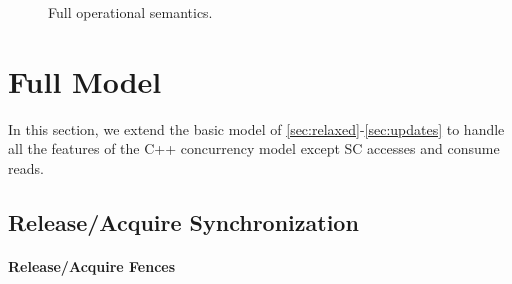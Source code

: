 {\begin{figure*}[t]
\caption{Full operational semantics.}
\label{fig:full-opsem-a}
\end{figure*}}


\section{Full Model}
\label{sec:full}

In this section, we extend the basic model of
\cref{sec:relaxed}-\ref{sec:updates} to handle all the
features of the C++ concurrency model except SC accesses and consume reads.


\subsection{Release/Acquire Synchronization}
\label{sec:relacq}

\paragraph{Release/Acquire Fences}

